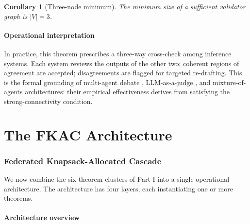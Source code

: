 \documentclass[11pt,twocolumn,a4paper]{article}
\newtheorem{corollary}[theorem]{Corollary}
\theoremstyle{definition}
\theoremstyle{remark}
\begin{document}
\begin{corollary}[Three-node minimum]
\label{cor:three-min}
The minimum size of a sufficient validator graph is $|V| = 3$.
\end{corollary}

\subsection{Operational interpretation}

In practice, this theorem prescribes a three-way cross-check among inference systems. Each system reviews the outputs of the other two; coherent regions of agreement are accepted; disagreements are flagged for targeted re-drafting. This is the formal grounding of multi-agent debate \citep{du2023improving}, LLM-as-a-judge \citep{zheng2023judging}, and mixture-of-agents \citep{wang2024mixture} architectures: their empirical effectiveness derives from satisfying the strong-connectivity condition.


\part{The FKAC Architecture}

\section{Federated Knapsack-Allocated Cascade}
\label{sec:fkac}

We now combine the six theorem clusters of Part I into a single operational architecture. The architecture has four layers, each instantiating one or more theorems.

\subsection{Architecture overview}
\end{document}
